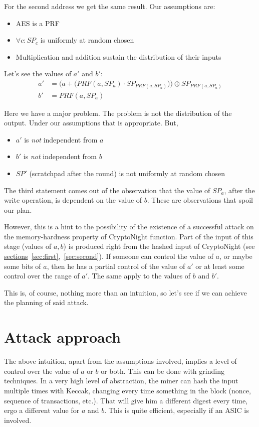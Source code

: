 For the second address we get the same result. Our assumptions are:
\begin{itemize}
  \item AES is a PRF
  \item $\forall c : SP_c$ is uniformly at random chosen
  \item Multiplication and addition sustain the distribution of their inputs
\end{itemize}

Let's see the values of $a'$ and $b'$:
\begin{align} \label{eq:normal_1}
  a' &= \Big( a + \big( PRF(a, SP_{a}) \cdot SP_{PRF(a, SP_a)} \big) \Big) \oplus SP_{PRF(a, SP_a)}\\ b' &= PRF(a, SP_{a}) \label{eq:normal_2}
\end{align}

Here we have a major problem. The problem is not the distribution of the output. Under our assumptions that is appropriate. But,
\begin{itemize}
  \item $a'$ is \emph{not} independent from $a$
  \item $b'$ is \emph{not} independent from $b$
  \item $SP'$ (scratchpad after the round) is not uniformly at random chosen
\end{itemize}
The third statement comes out of the observation that the value of $SP_a$, after the write operation, is dependent on the value of $b$. These are observations that spoil our plan.

However, this is a hint to the possibility of the existence of a successful attack on the memory-hardness property of CryptoNight function. Part of the input of this stage (values of $a,b$) is produced right from the hashed input of CryptoNight (see \hyperref[sec:first]{sections}~\ref{sec:first},~\ref{sec:second}). If someone can control the value of $a$, or maybe some bits of $a$, then he has a partial control of the value of $a'$ or at least some control over the range of $a'$. The same apply to the values of $b$ and $b'$.

This is, of course, nothing more than an intuition, so let's see if we can achieve the planning of said attack.
\section{Attack approach}
The above intuition, apart from the assumptions involved, implies a level of control over the value of $a$ or $b$ or both. This can be done with grinding techniques. In a very high level of abstraction, the miner can hash the input multiple times with Keccak, changing every time something in the block (nonce, sequence of transactions, etc.). That will give him a different digest every time, ergo a different value for $a$ and $b$. This is quite efficient, especially if an ASIC is involved.

